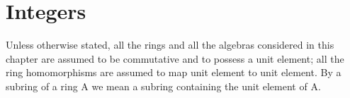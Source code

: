 \chapter{Integers}

Unless otherwise stated, all the rings and all the algebras considered in this chapter are assumed to be commutative and to possess a unit element; all the ring homomorphisms are assumed to map unit element to unit element. By a subring of a ring A we mean a subring containing the unit element of A.

